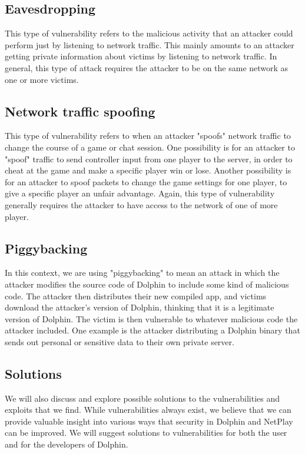 \documentclass[conference]{IEEEtran}
\begin{document}
\subsection{Eavesdropping}
This type of vulnerability refers to the malicious activity that an attacker could perform just by listening to network traffic.
This mainly amounts to an attacker getting private information about victims by listening to network traffic.
In general, this type of attack requires the attacker to be on the same network as one or more victims.

\subsection{Network traffic spoofing}
This type of vulnerability refers to when an attacker "spoofs" network traffic to change the course of a game or chat session.
One possibility is for an attacker to "spoof" traffic to send controller input from one player to the server, in order to cheat at the game and make a specific player win or lose.
Another possibility is for an attacker to spoof packets to change the game settings for one player, to give a specific player an unfair advantage.
Again, this type of vulnerability generally requires the attacker to have access to the network of one of more player.

\subsection{Piggybacking}
In this context, we are using "piggybacking" to mean an attack in which the attacker modifies the source code of Dolphin to include some kind of malicious code.
The attacker then distributes their new compiled app, and victims download the attacker's version of Dolphin, thinking that it is a legitimate version of Dolphin.
The victim is then vulnerable to whatever malicious code the attacker included.
One example is the attacker distributing a Dolphin binary that sends out personal or sensitive data to their own private server.

\subsection{Solutions}
We will also discuss and explore possible solutions to the vulnerabilities and exploits that we find.
While vulnerabilities always exist, we believe that we can provide valuable insight into various ways that security in Dolphin and NetPlay can be improved. 
We will suggest solutions to vulnerabilities for both the user and for the developers of Dolphin.
\end{document}
